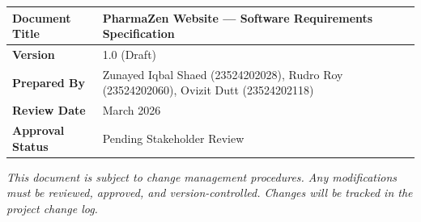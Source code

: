 \documentclass[12pt, a4paper]{article}
\begin{document}
\renewcommand{\arraystretch}{1.5}
\begin{tabular}{|L{3.8cm}|L{11.2cm}|}
  \hline
  \textbf{\small\color{darkgreen}Document Title} & \small PharmaZen Website --- Software Requirements Specification \\
  \hline
  \textbf{\small\color{darkgreen}Version} & \small 1.0 (Draft) \\
  \hline
  \textbf{\small\color{darkgreen}Prepared By} & \small Zunayed Iqbal Shaed (23524202028), Rudro Roy (23524202060), Ovizit Dutt (23524202118) \\
  \hline
  \textbf{\small\color{darkgreen}Review Date} & \small March 2026 \\
  \hline
  \textbf{\small\color{darkgreen}Approval Status} & \small Pending Stakeholder Review \\
  \hline
\end{tabular}

\vspace{14pt}
\small\color{textgray}\textit{This document is subject to change management procedures. Any modifications must be reviewed, approved, and version-controlled. Changes will be tracked in the project change log.}
\end{document}
